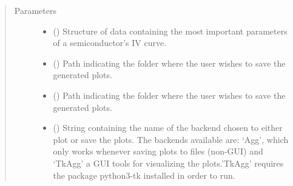 \documentclass[letterpaper,10pt,english,openany, oneside]{sphinxmanual}
\begin{document}
\begin{fulllineitems}
\begin{fulllineitems}
\begin{fulllineitems}
\end{fulllineitems}

\begin{quote}\begin{description}
\item[{Parameters}] \leavevmode\begin{itemize}
\item {} 
 () \textendash{} Structure of data containing the most important parameters of a semiconductor’s IV curve.

\item {} 
 (\sphinxstyleliteralemphasis{\sphinxupquote{, }}) \textendash{} Path indicating the folder where the user wishes to save the generated plots.

\item {} 
 (\sphinxstyleliteralemphasis{\sphinxupquote{, }}) \textendash{} Path indicating the folder where the user wishes to save the generated plots.

\item {} 
 () \textendash{} String containing the name of the backend chosen to either plot or save the plots. The backends available are:
‘Agg’, which only works whenever saving plots to files (non-GUI) and ‘TkAgg’ a GUI tools for visualizing the plots.’TkAgg’ requires the package python3-tk installed in order to run.

\end{itemize}

\end{description}\end{quote}

\end{fulllineitems}


\begin{fulllineitems}
\label{\detokenize{index:fompy.plots.plotter.hist}}~


\end{fulllineitems}
\end{fulllineitems}
\end{document}
